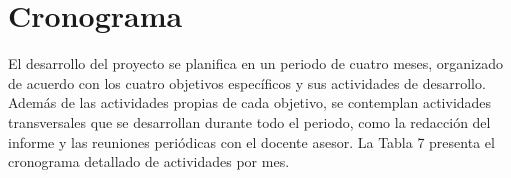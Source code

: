 \documentclass[stu, spanish]{apa7}
\begin{document}
\section{Cronograma}

El desarrollo del proyecto se planifica en un periodo de cuatro meses, organizado de acuerdo con los cuatro objetivos espec\'{i}ficos y sus actividades de desarrollo. Adem\'{a}s de las actividades propias de cada objetivo, se contemplan actividades transversales que se desarrollan durante todo el periodo, como la redacci\'{o}n del informe y las reuniones peri\'{o}dicas con el docente asesor. La Tabla 7 presenta el cronograma detallado de actividades por mes.
\end{document}
